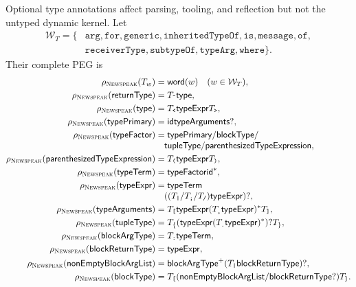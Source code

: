 Optional type annotations affect parsing, tooling, and reflection but not the
untyped dynamic kernel.  Let
\begin{equation}\label{eq:newspeak-type-word-set}
\begin{split}
 \mathcal W_T=\{&\texttt{arg},\texttt{for},\texttt{generic},
 \texttt{inheritedTypeOf},\texttt{is},\texttt{message},\texttt{of},\\[-1mm]
 &\texttt{receiverType},\texttt{subtypeOf},\texttt{typeArg},\texttt{where}\}.
\end{split}
\end{equation}
Their complete PEG is
\begin{equation}\label{eq:newspeak-type-peg}
\begin{aligned}
 \rho_{\NS}(T_w)&=\mathsf{word}(w)\quad(w\in\mathcal W_T),\\
 \rho_{\NS}(\mathsf{returnType})&=T_{\texttt{\char94}}\mathsf{type},\\
 \rho_{\NS}(\mathsf{type})&=T_{\texttt{<}}\mathsf{typeExpr}T_{\texttt{>}},\\
 \rho_{\NS}(\mathsf{typePrimary})&=\mathsf{id}\mathsf{typeArguments}?,\\
 \rho_{\NS}(\mathsf{typeFactor})&=\mathsf{typePrimary}/\mathsf{blockType}/\\[-1mm]
 &\quad\mathsf{tupleType}/\mathsf{parenthesizedTypeExpression},\\
 \rho_{\NS}(\mathsf{parenthesizedTypeExpression})&=
      T_{\texttt{(}}\mathsf{typeExpr}T_{\texttt{)}},\\
 \rho_{\NS}(\mathsf{typeTerm})&=\mathsf{typeFactor}\mathsf{id}^*,\\
 \rho_{\NS}(\mathsf{typeExpr})&=\mathsf{typeTerm}\\[-1mm]
 &\quad((T_{\texttt{|}}/T_{\texttt{;}}/T_{\texttt{/}})
      \mathsf{typeExpr})?,\\
 \rho_{\NS}(\mathsf{typeArguments})&=T_{\texttt{[}}\mathsf{typeExpr}
      (T_{\texttt{,}}\mathsf{typeExpr})^*T_{\texttt{]}},\\
 \rho_{\NS}(\mathsf{tupleType})&=T_{\{}(
      \mathsf{typeExpr}(T_{\texttt{.}}\mathsf{typeExpr})^*)?T_{\}},\\
 \rho_{\NS}(\mathsf{blockArgType})&=T_{\texttt{:}}\mathsf{typeTerm},\\
 \rho_{\NS}(\mathsf{blockReturnType})&=\mathsf{typeExpr},\\
 \rho_{\NS}(\mathsf{nonEmptyBlockArgList})&=
      \mathsf{blockArgType}^+(T_{\texttt{|}}\mathsf{blockReturnType})?,\\
 \rho_{\NS}(\mathsf{blockType})&=T_{\texttt{[}}
      (\mathsf{nonEmptyBlockArgList}/\mathsf{blockReturnType}?)T_{\texttt{]}}.
\end{aligned}
\end{equation}
